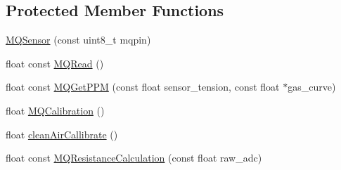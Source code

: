 \subsection*{Protected Member Functions}
\begin{DoxyCompactItemize}
\item 
\hyperlink{class_m_q_sensor_a58bc8dbc8dc2e97584a34f1a545f93e1}{M\+Q\+Sensor} (const uint8\+\_\+t mqpin)
\item 
float const \hyperlink{class_m_q_sensor_ac769cc3eade7067313d185848f63f2cf}{M\+Q\+Read} ()
\item 
float const \hyperlink{class_m_q_sensor_a5caabfe6b2ab4239e87bed0dc4b15e17}{M\+Q\+Get\+P\+PM} (const float sensor\+\_\+tension, const float $\ast$gas\+\_\+curve)
\item 
float \hyperlink{class_m_q_sensor_aae67f9f2749712bd2afa90a2a97a29fd}{M\+Q\+Calibration} ()
\item 
float \hyperlink{class_m_q_sensor_a7d847ec6399107b28bdedacd1e1e4a2c}{clean\+Air\+Callibrate} ()
\item 
float const \hyperlink{class_m_q_sensor_a49d1805ec8953416b3e0b50f6df130f2}{M\+Q\+Resistance\+Calculation} (const float raw\+\_\+adc)
\end{DoxyCompactItemize}

